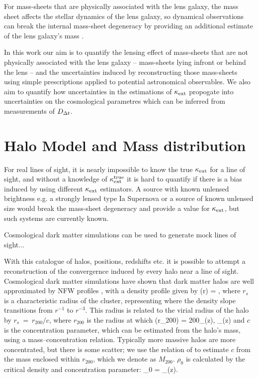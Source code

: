 \documentclass[useAMS,usenatbib]{mn2e}
\begin{document}
For mass-sheets that are physically associated with the lens galaxy, the mass sheet
 affects the stellar dynamics of the
lens galaxy, so dynamical observations can break the internal
mass-sheet degeneracy by providing an additional estimate of the lens galaxy's mass
\citep[e.g.,][]{citations}. 

In this work our aim is to quantify the lensing effect of mass-sheets that are not physically associated with the lens galaxy -- mass-sheets
lying infront or behind the lens -- and the uncertainties induced by reconstructing
those mass-sheets using simple prescriptions applied to potential astronomical observables.
We also aim to quantify how uncertainties in the
estimations of $\kappa_{\rm ext}$ propogate into uncertainties on the cosmological parametres
which can be inferred from measurements of $D_{\Delta t}$.



\section{Halo Model and Mass distribution}
\label{sec:model}

For real lines of sight, it is nearly impossible to know the true $\kappa_{\rm ext}$ for a
line of sight, and without a knowledge of $\kappa_{\rm ext}^{\mathrm{true}}$ it is hard to
quantify if there is a bias induced by using different $\kappa_{\rm ext}$ estimators.
A source with known unlensed brightness e.g. a strongly lensed type Ia
Supernova  or a source of known unlensed size 
would break the mass-sheet degeneracy and provide a value for $\kappa_{\rm ext}$, but
 such systems are currently known.

Cosmological dark matter simulations can be used to generate mock lines of sight...

With this catalogue of halos, positions, redshifts etc. it is possible to attempt
a reconstruction of the convergernce induced by every halo near a line of sight.
Cosmological dark matter simulations have shown that dark matter halos are well
approximated by NFW profiles \citep{NFW1997}, with a density profile given by
\be\label{eq:rhonfw}
\rho(r) = 
,
\ee
where $r_{s}$ is a characteristic radius of the cluster, representing where
the density slope transitions from $r^{-1}$ to $r^{-3}$. This radius is related
to the virial radius of the halo by $r_{s}~=~r_{200}/c$, where $r_{200}$ is the radius at 
which 
\be
\rho(r_{200}) = 200\rho_{{}}(z),  \rho_{}(z) \equiv {}
\ee
 and $c$ is the concentration parameter, which can be estimated from the halo's mass,
using a mass--concentration relation. Typically more massive halos are more concentrated,
but there is some scatter; we use the relation of \citet{neto2007} to estimate $c$
from the mass enclosed within $r_{200}$, which we denote as $M_{200}$. $\rho_0$ is calculated 
by the critical density and concentration parameter:
\be
\rho_0 = \rho_{}(z).
\ee
\end{document}
